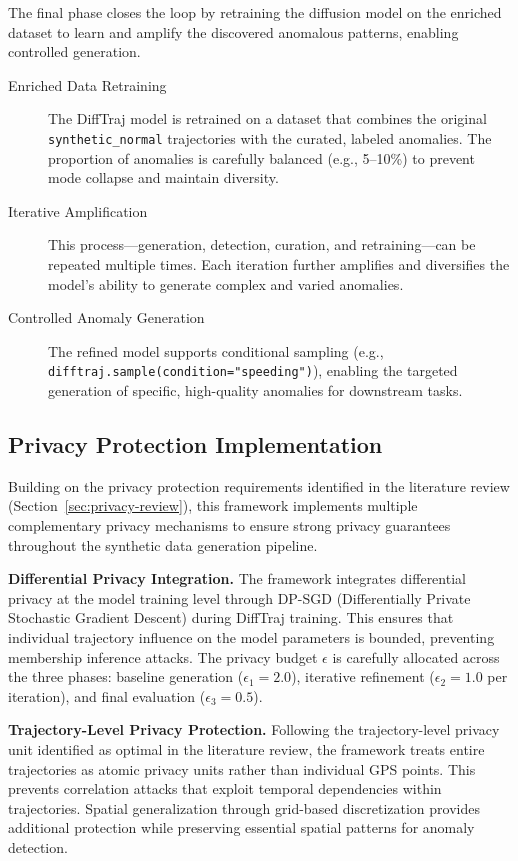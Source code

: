 \documentclass[runningheads]{llncs}
\begin{document}
The final phase closes the loop by retraining the diffusion model on the enriched dataset to learn and amplify the discovered anomalous patterns, enabling controlled generation.

\begin{description}
    \item[Enriched Data Retraining] The DiffTraj model is retrained on a dataset that combines the original \texttt{synthetic\_normal} trajectories with the curated, labeled anomalies. The proportion of anomalies is carefully balanced (e.g., 5--10\%) to prevent mode collapse and maintain diversity.
    \item[Iterative Amplification] This process---generation, detection, curation, and retraining---can be repeated multiple times. Each iteration further amplifies and diversifies the model's ability to generate complex and varied anomalies.
    \item[Controlled Anomaly Generation] The refined model supports conditional sampling (e.g., \texttt{difftraj.sample(condition="speeding")}), enabling the targeted generation of specific, high-quality anomalies for downstream tasks.
\end{description}

\subsection{Privacy Protection Implementation}
\label{sec:privacy-implementation}

Building on the privacy protection requirements identified in the literature review (Section~\ref{sec:privacy-review}), this framework implements multiple complementary privacy mechanisms to ensure strong privacy guarantees throughout the synthetic data generation pipeline.

\textbf{Differential Privacy Integration.} The framework integrates differential privacy at the model training level through DP-SGD (Differentially Private Stochastic Gradient Descent) during DiffTraj training. This ensures that individual trajectory influence on the model parameters is bounded, preventing membership inference attacks. The privacy budget $\epsilon$ is carefully allocated across the three phases: baseline generation ($\epsilon_1 = 2.0$), iterative refinement ($\epsilon_2 = 1.0$ per iteration), and final evaluation ($\epsilon_3 = 0.5$).

\textbf{Trajectory-Level Privacy Protection.} Following the trajectory-level privacy unit identified as optimal in the literature review, the framework treats entire trajectories as atomic privacy units rather than individual GPS points. This prevents correlation attacks that exploit temporal dependencies within trajectories. Spatial generalization through grid-based discretization provides additional protection while preserving essential spatial patterns for anomaly detection.
\end{document}
